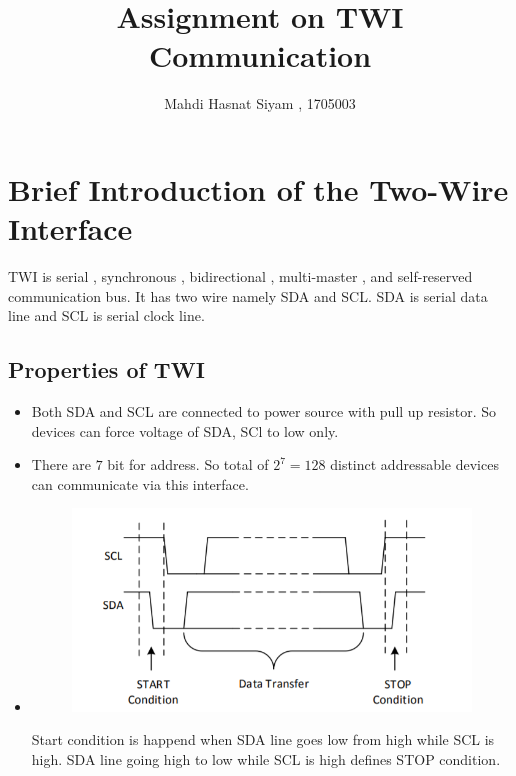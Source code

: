 \documentclass{article}
\title{Assignment on TWI Communication}
\author{Mahdi Hasnat Siyam , 1705003}
\begin{document}
\maketitle


\section{Brief Introduction of the Two-Wire Interface}
TWI is serial , synchronous , bidirectional ,
multi-master , and self-reserved communication bus.
It has two wire namely SDA and SCL.
SDA is serial data line and SCL is serial clock line.
\subsection{Properties of TWI}
\begin{itemize}
	\item Both SDA and SCL are connected to power 
	source with pull up resistor. So devices can force voltage of SDA, SCl to low only.
	\item There are $7$ bit for address. 
	So total of $2^7 = 128$ distinct addressable devices can communicate via this interface.

	\item 
	\begin{figure}[h!]
		\centering
		\includegraphics[scale=0.5]{images/start-stop-condition.png}
	\end{figure}
	Start condition is happend when SDA line goes low from high while SCL is high. SDA line going high to low while SCL is high defines STOP condition.
\end{itemize}
\end{document}
